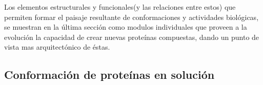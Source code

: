 Los elementos estructurales y funcionales(y las relaciones entre estos) que permiten formar el paisaje resultante de conformaciones y actividades biológicas, 
se muestran en la última sección como modulos individuales que proveen a la evolución la capacidad de crear nuevas proteínas compuestas, dando un punto de vista mas arquitectónico de éstas.




































\subsection{Conformación de proteínas en solución} \label{conformationalLandscape}





